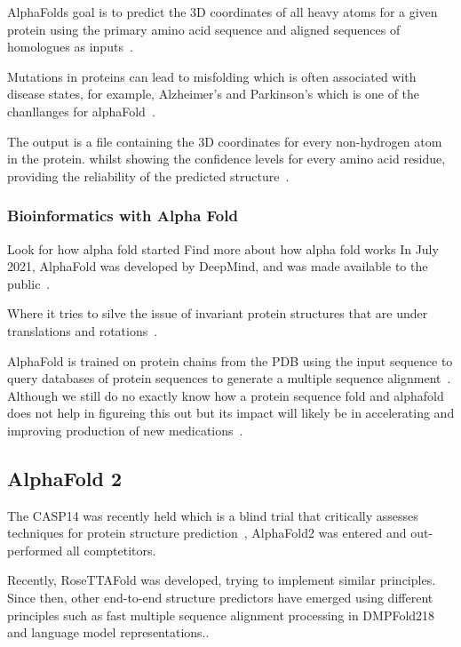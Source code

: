 \documentclass{report}
\begin{document}
AlphaFolds goal is to  predict the 3D coordinates of all heavy atoms for a given protein using the primary amino acid sequence and aligned sequences of homologues as inputs~\cite{jumper_highly_2021}.

Mutations in proteins can lead to misfolding which is often associated with disease states, for example, Alzheimer’s and Parkinson’s which is one of the chanllanges for alphaFold~\cite{felix_brief_nodate}.

The output is a file containing the 3D coordinates for every non-hydrogen atom in the protein. whilst showing the confidence levels for every amino acid residue, providing the reliability of the predicted structure~\cite{felix_brief_nodate}.

\subsubsection{Bioinformatics with Alpha Fold}

Look for how alpha fold started
Find more about how alpha fold works
In July 2021, AlphaFold was developed by DeepMind, and was made available to
the public~\cite{tunyasuvunakool_highly_2021}. 

Where it tries to silve the issue of invariant protein structures that are under translations and rotations~\cite{baldi_principled_nodate}.

AlphaFold is trained on protein chains from the PDB using the input sequence to query databases of protein sequences to generate a multiple sequence alignment~\cite{jumper_highly_2021}. Although we still do no exactly know how a protein sequence fold and alphafold does not help in figureing this out but its impact will likely be in accelerating and improving production of new medications~\cite{nussinov_alphafold_2022}.


\subsection{AlphaFold 2}

The CASP14 was recently held which is a blind trial that critically assesses
techniques for protein structure prediction~\cite{david_alphafold_2022}, AlphaFold2 was entered and out-performed all comptetitors. 

Recently, RoseTTAFold was developed, trying to implement similar principles. Since then, other end-to-end structure predictors have emerged using different principles such as fast multiple sequence alignment processing in DMPFold218 and language model representations.\cite{bryant_improved_2022}.
\end{document}
